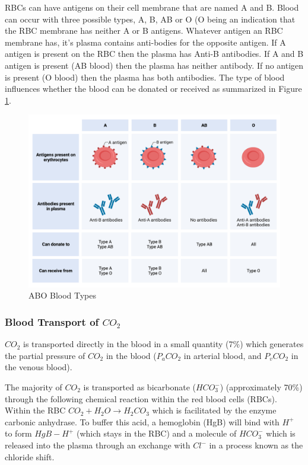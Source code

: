 RBCs can have antigens on their cell membrane that are named A and B. Blood can occur with three possible types, A, B, AB or O (O being an indication that the RBC membrane has neither A or B antigens. Whatever antigen an RBC membrane has, it's plasma contains anti-bodies for the opposite antigen. If A antigen is present on the RBC then the plasma has Anti-B antibodies. If A and B antigen is present (AB blood) then the plasma has neither antibody. If no antigen is present (O blood) then the plasma has both antibodies. The type of blood influences whether the blood can be donated or received as summarized in Figure \ref{fig:ABO}.


\begin{figure}
    \centering
    \includegraphics{./figure/ABO.png}
    \caption{ABO Blood Types}
    \label{fig:ABO}
\end{figure}

\subsubsection{Blood Transport of $CO_2$}

$CO_2$ is transported directly in the blood in a small quantity (7\%) which generates the partial pressure of $CO_2$ in the blood ($P_aCO_2$ in arterial blood, and $P_vCO_2$ in the venous blood). 

The majority of $CO_2$ is transported as bicarbonate ($HCO_3^-$) (approximately 70\%) through the following chemical reaction within the red blood cells (RBCs). 
Within the RBC $CO_2 + H_2O \rightarrow H_2CO_3$ which is facilitated by the enzyme carbonic anhydrase. To buffer this acid, a hemoglobin (HgB) will bind with $H^+$ to form $HgB-H^+$ (which stays in the RBC) and a molecule of $HCO_3^-$ which is released into the plasma through an exchange with $Cl^-$ in a process known as the chloride shift.

